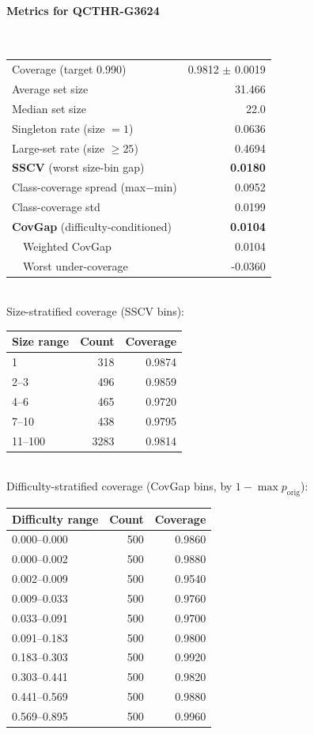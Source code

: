\documentclass[parskip=half]{scrartcl}
\begin{document}
\paragraph{Metrics for QCTHR-G3624}~\\
\begin{tabular}{l r}
\hline
Coverage (target 0.990) & 0.9812 $\pm$ 0.0019 \\
Average set size & 31.466 \\
Median set size & 22.0 \\
Singleton rate (size $=1$) & 0.0636 \\
Large-set rate (size $\geq 25$) & 0.4694 \\
\textbf{SSCV} (worst size-bin gap) & \textbf{0.0180} \\
Class-coverage spread (max$-$min) & 0.0952 \\
Class-coverage std & 0.0199 \\
\textbf{CovGap} (difficulty-conditioned) & \textbf{0.0104} \\
~~Weighted CovGap & 0.0104 \\
~~Worst under-coverage & -0.0360 \\
\hline
\end{tabular}\\[0.5em]
\textsf{\scriptsize Size-stratified coverage (SSCV bins):}\\
\begin{tabular}{l r r}
\hline
Size range & Count & Coverage \\
\hline
1 & 318 & 0.9874 \\
2--3 & 496 & 0.9859 \\
4--6 & 465 & 0.9720 \\
7--10 & 438 & 0.9795 \\
11--100 & 3283 & 0.9814 \\
\hline
\end{tabular}\\[0.5em]
\textsf{\scriptsize Difficulty-stratified coverage (CovGap bins, by $1-\max p_{\mathrm{orig}}$):}\\
\begin{tabular}{l r r}
\hline
Difficulty range & Count & Coverage \\
\hline
0.000--0.000 & 500 & 0.9860 \\
0.000--0.002 & 500 & 0.9880 \\
0.002--0.009 & 500 & 0.9540 \\
0.009--0.033 & 500 & 0.9760 \\
0.033--0.091 & 500 & 0.9700 \\
0.091--0.183 & 500 & 0.9800 \\
0.183--0.303 & 500 & 0.9920 \\
0.303--0.441 & 500 & 0.9820 \\
0.441--0.569 & 500 & 0.9880 \\
0.569--0.895 & 500 & 0.9960 \\
\hline
\end{tabular}\\[0.5em]
\end{document}

